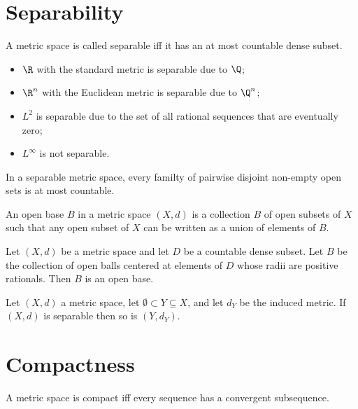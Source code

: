 \documentclass{article}
\begin{document}
\section{Separability}

\begin{definition}
	A metric space is called separable iff it has an at most countable dense subset.
\end{definition}
\begin{itemize}
	\item $\R$ with the standard metric is separable due to $\Q$;
	\item $\R^n$ with the Euclidean metric is separable due to $\Q^n$;
	\item $L^2$ is separable due to the set of all rational sequences that are eventually zero;
	\item $L^\infty$ is not separable.
\end{itemize}

\begin{proposition}[8.3]
	In a separable metric space, every familty of pairwise disjoint non-empty open
	sets is at most countable.
\end{proposition}

\begin{definition}
	An open base $B$ in a metric space $(X,d)$ is a collection $B$ of open subsets
	of $X$ such that any open subset of $X$ can be written as a union of elements of $B$.
\end{definition}

\begin{proposition}[8.5]
	Let $(X,d)$ be a metric space and let $D$ be a countable dense subset. Let $B$
	be the collection of open balls centered at elements of $D$ whose radii are positive
	rationals. Then $B$ is an open base.
\end{proposition}

\begin{proposition}[8.6]
	Let $(X,d)$ a metric space, let $\emptyset\subset Y\subseteq X$, and let
	$d_Y$ be the induced metric. If $(X,d)$ is separable then so is $(Y,d_Y)$.
\end{proposition}

\section{Compactness}

\begin{definition}
	A metric space is compact iff every sequence has a convergent subsequence.
\end{definition}
\end{document}
